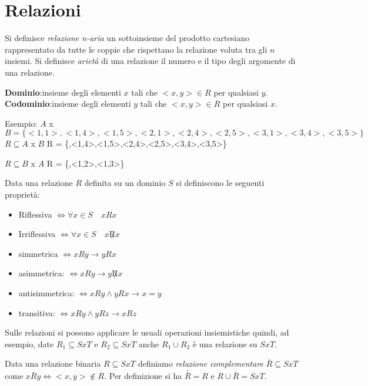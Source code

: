 \chapter{Relazioni}
Si definisce \textit{relazione n-aria} un sottoinsieme del prodotto cartesiano
rappresentato da tutte le coppie che rispettano la relazione voluta tra gli $n$ insiemi.
Si definisce \textit{arietà} di una relazione il numero e il tipo degli argomente
di una relazione.

\textbf{Dominio}:insieme degli elementi $x$ tali che $<x,y> \in R$ per qualsiasi $y$.
\textbf{Codominio}:insieme degli elementi $y$ tali che $<x,y> \in R$ per qualsiasi $x$.

Esempio:\newline
$A$ x $B = \{<1,1>,<1,4>,<1,5>,<2,1>,<2,4>,<2,5>,<3,1>,<3,4>,<3,5>\} $ \newline
$R \subseteq A$ x $B$\newline
R = \{<1,1>,<1,4>,<1,5>,<2,4>,<2,5>,<3,4>,<3,5>\}

$R \subseteq B$ x $A$ \newline
R = \{<1,1>,<1,2>,<1,3>\}

Data una relazione $R$ definita su un dominio $S$ si definiscono le seguenti proprietà:

\begin{itemize}
  \item Riflessiva $\iff \forall x \in S \quad xRx$
  \item Irriflessiva $\iff \forall x \in S \quad x \not R x$
  \item simmetrica $\iff  xRy \rightarrow yRx$
  \item asimmetrica: $\iff xRy \rightarrow y \not R x$
  \item antisimmetrica: $\iff xRy \land yRx \rightarrow x = y$
  \item transitiva: $\iff xRy \land yRz \rightarrow xRz$
\end{itemize}


Sulle relazioni si possono applicare le usuali operazioni insiemistiche quindi, ad esempio,
date $R_1 \subseteq S x T$ e $R_2 \subseteq S x T$ anche $R_1 \cup R_2$ è una relazione su $S x T$.

Data una relazione binaria $R \subseteq S x T$ definiamo \emph{relazione complementare}
$\bar{R} \subseteq S x T$ come $x \bar{R}y \iff <x,y> \not \in R$.
Per definizione si ha $\bar{\bar{R}} = R$ e $R \cup \bar{R} = S x T$.

